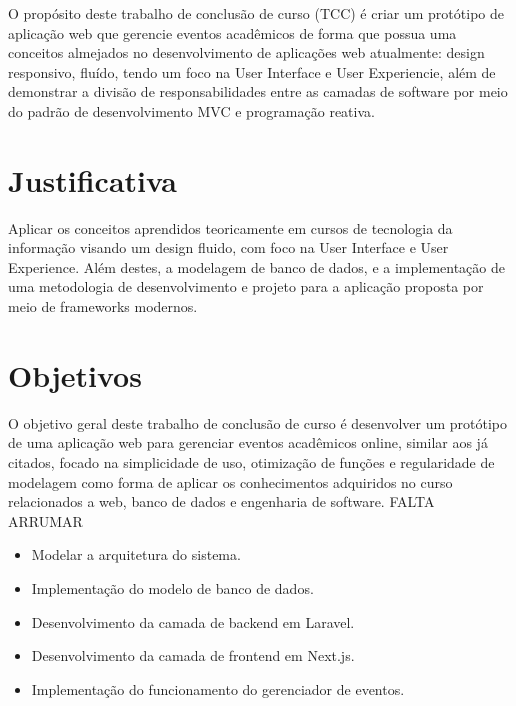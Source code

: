 O propósito deste trabalho de conclusão de curso (TCC) é criar um protótipo de aplicação web que gerencie eventos acadêmicos de forma que possua uma conceitos almejados no desenvolvimento de aplicações web atualmente: design responsivo, fluído, tendo um foco na User Interface e User Experiencie, além de demonstrar a divisão de responsabilidades entre as camadas de software por meio do padrão de desenvolvimento MVC e programação reativa.


\section{Justificativa}

Aplicar os conceitos aprendidos teoricamente em cursos de tecnologia da informação  visando um design fluido, com foco na User Interface e User Experience. Além destes, a modelagem de banco de dados, e a implementação de uma metodologia de desenvolvimento e projeto para a aplicação proposta por meio de frameworks modernos.


\section{Objetivos}
O objetivo geral deste trabalho de conclusão de curso é desenvolver um protótipo de uma aplicação web para gerenciar eventos acadêmicos online, similar aos já citados, focado na simplicidade de uso, otimização de funções e regularidade de modelagem como forma de aplicar os conhecimentos adquiridos no curso relacionados a web, banco de dados e engenharia de software. FALTA ARRUMAR

\begin{itemize}
    \item Modelar a arquitetura do sistema.
    \item Implementação do modelo de banco de dados.
    \item Desenvolvimento da camada de backend em Laravel.
    \item Desenvolvimento da camada de frontend em Next.js.
    \item Implementação do funcionamento do gerenciador de eventos.
\end{itemize}

